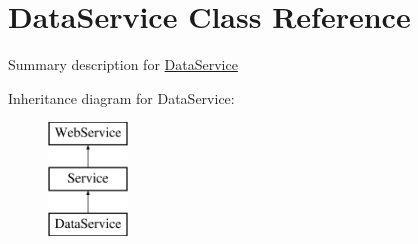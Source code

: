 \hypertarget{class_data_service}{\section{Data\-Service Class Reference}
\label{class_data_service}
}


Summary description for \hyperlink{class_data_service}{Data\-Service}  


Inheritance diagram for Data\-Service\-:\begin{figure}[H]
\begin{center}
\leavevmode
\includegraphics[height=3.000000cm]{class_data_service}
\end{center}
\end{figure}
